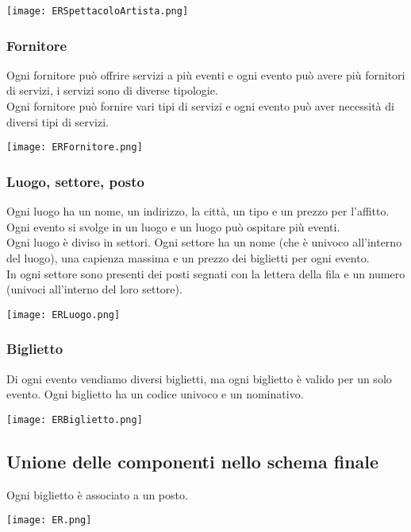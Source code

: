 \documentclass[a4paper,11pt]{article}
\begin{document}
\texttt{[image: ERSpettacoloArtista.png]}

\subsubsection*{Fornitore}

Ogni fornitore può offrire servizi a più eventi e ogni evento può avere più fornitori di servizi, i servizi sono di diverse tipologie.\\
Ogni fornitore può fornire vari tipi di servizi e ogni evento può aver necessità di diversi tipi di servizi.

\texttt{[image: ERFornitore.png]}

\subsubsection*{Luogo, settore, posto}

Ogni luogo ha un nome, un indirizzo, la città, un tipo e un prezzo per l'affitto.
Ogni evento si svolge in un luogo e un luogo può ospitare più eventi.\\
Ogni luogo è diviso in settori.
Ogni settore ha un nome (che è univoco all'interno del luogo), una capienza massima e un prezzo dei biglietti per ogni evento.\\
In ogni settore sono presenti dei posti segnati con la lettera della fila e un numero (univoci all'interno del loro settore).

\vspace*{.5em}
\texttt{[image: ERLuogo.png]}

\subsubsection*{Biglietto}

Di ogni evento vendiamo diversi biglietti, ma ogni biglietto è valido per un solo evento.
Ogni biglietto ha un codice univoco e un nominativo.

\vspace*{.5em}
\texttt{[image: ERBiglietto.png]}

\subsection{Unione delle componenti nello schema finale}

Ogni biglietto è associato a un posto.

\vspace*{1em}
\texttt{[image: ER.png]}
\end{document}
